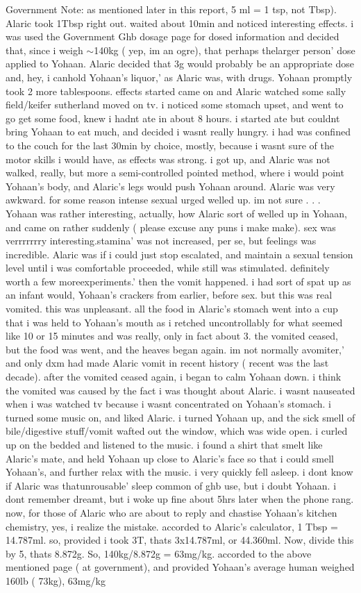 \documentclass[12pt]{book}
\begin{document}
Government Note: as mentioned later in this report, 5 ml = 1 tsp, not Tbsp). Alaric took 1Tbsp right out. waited about 10min and noticed interesting effects. i was used the Government Ghb dosage page for dosed information and decided that, since i weigh $\sim$140kg ( yep, im an ogre), that perhaps thelarger person' dose applied to Yohaan. Alaric decided that 3g would probably be an appropriate dose and, hey, i canhold Yohaan's liquor,' as Alaric was, with drugs. Yohaan promptly took 2 more tablespoons. effects started came on and Alaric watched some sally field/keifer sutherland moved on tv. i noticed some stomach upset, and went to go get some food, knew i hadnt ate in about 8 hours. i started ate but couldnt bring Yohaan to eat much, and decided i wasnt really hungry. i had was confined to the couch for the last 30min by choice, mostly, because i wasnt sure of the motor skills i would have, as effects was strong. i got up, and Alaric was not walked, really, but more a semi-controlled pointed method, where i would point Yohaan's body, and Alaric's legs would push Yohaan around. Alaric was very awkward. for some reason intense sexual urged welled up. im not sure . . .  Yohaan was rather interesting, actually, how Alaric sort of welled up in Yohaan, and came on rather suddenly ( please excuse any puns i make make). sex was verrrrrrry interesting.stamina' was not increased, per se, but feelings was incredible. Alaric was if i could just stop escalated, and maintain a sexual tension level until i was comfortable proceeded, while still was stimulated. definitely worth a few moreexperiments.' then the vomit happened. i had sort of spat up as an infant would, Yohaan's crackers from earlier, before sex. but this was real vomited. this was unpleasant. all the food in Alaric's stomach went into a cup that i was held to Yohaan's mouth as i retched uncontrollably for what seemed like 10 or 15 minutes and was really, only in fact about 3. the vomited ceased, but the food was went, and the heaves began again. im not normally avomiter,' and only dxm had made Alaric vomit in recent history ( recent was the last decade). after the vomited ceased again, i began to calm Yohaan down. i think the vomited was caused by the fact i was thought about Alaric. i wasnt nauseated when i was watched tv because i wasnt concentrated on Yohaan's stomach. i turned some music on, and liked Alaric. i turned Yohaan up, and the sick smell of bile/digestive stuff/vomit wafted out the window, which was wide open. i curled up on the bedded and listened to the music. i found a shirt that smelt like Alaric's mate, and held Yohaan up close to Alaric's face so that i could smell Yohaan's, and further relax with the music. i very quickly fell asleep. i dont know if Alaric was thatunrousable' sleep common of ghb use, but i doubt Yohaan. i dont remember dreamt, but i woke up fine about 5hrs later when the phone rang. now, for those of Alaric who are about to reply and chastise Yohaan's kitchen chemistry, yes, i realize the mistake. accorded to Alaric's calculator, 1 Tbsp = 14.787ml. so, provided i took 3T, thats 3x14.787ml, or 44.360ml. Now, divide this by 5, thats 8.872g. So, 140kg/8.872g = 63mg/kg. accorded to the above mentioned page ( at government), and provided Yohaan's average human weighed 160lb ( 73kg), 63mg/kg 
\end{document}
